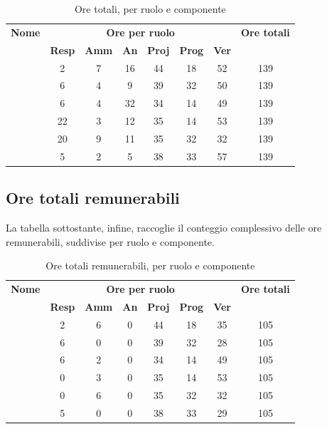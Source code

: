 \begin{table}[H]
	\begin{center}
		\begin{tabular}{|c|c|c|c|c|c|c|c|}
			\hline
			\textbf{Nome} & \multicolumn{6}{c|}{\textbf{Ore per ruolo}} & \textbf{Ore totali} \\\cline{2-7}
			& \textbf{Resp} & \textbf{Amm} & \textbf{An} & \textbf{Proj} & \textbf{Prog} & \textbf{Ver} & \\
			\hline
			\MC			&	2	&	7	&	16	&	44	&	18	&	52	&	139	\\
			\hline
			\AN			&	6	&	4	&	9	&	39	&	32	&	50	& 	139	\\
			\hline
			\DAN		&	6	&	4	&	32	&	34	&	14	&	49	&	139	\\
			\hline
			\AS			&	22	&	3 	&	12 	&	35	&	14 	& 	53	&	139	\\
			\hline
			\NS 		&	20	&	9	&	11	&	35	&	32	& 	32	&	139	\\
			\hline
			\DS			& 	5	&	2	&	5	&	38	&	33	&	57	&	139	\\
			\hline
		\end{tabular}
	\end{center}
	\caption{Ore totali, per ruolo e componente}
\end{table}

\subsection{Ore totali remunerabili}
La tabella sottostante, infine, raccoglie il conteggio complessivo delle ore remunerabili, suddivise per ruolo e componente.

\begin{table}[H]
	\begin{center}
		\begin{tabular}{|c|c|c|c|c|c|c|c|}
			\hline
			\textbf{Nome} & \multicolumn{6}{c|}{\textbf{Ore per ruolo}} & \textbf{Ore totali} \\\cline{2-7}
			& \textbf{Resp} & \textbf{Amm} & \textbf{An} & \textbf{Proj} & \textbf{Prog} & \textbf{Ver} & \\
			\hline
			\MC			&	2	&	6	&	0	&	44	&	18	&	35	&	105	\\
			\hline
			\AN			&	6	&	0	&	0	&	39	&	32	&	28	& 	105	\\
			\hline
			\DAN		&	6	&	2	&	0	&	34	&	14	&	49	&	105	\\
			\hline
			\AS			&	0	&	3 	&	0 	&	35	&	14 	& 	53	&	105	\\
			\hline
			\NS 		&	0	&	6	&	0	&	35	&	32	& 	32	&	105	\\
			\hline
			\DS			& 	5	&	0	&	0	&	38	&	33	&	29	&	105	\\
			\hline
		\end{tabular}
	\end{center}
	\caption{Ore totali remunerabili, per ruolo e componente}
\end{table}
